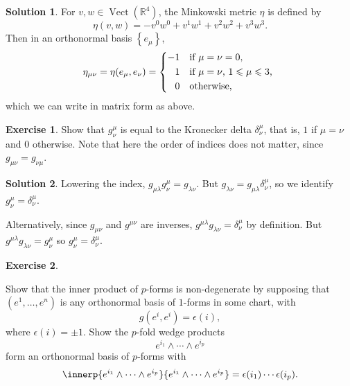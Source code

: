 \documentclass[11pt, a4paper]{report}
\theoremstyle{definition}
\newtheorem{exercise}{Exercise}[part]
\newtheorem{solution}{Solution}[part]
\newenvironment{ex}{\begin{exercise}}{\end{exercise}\pagebreak[1]}
\newenvironment{sol}{\begin{solution}}{\end{solution}\pagebreak[3]}
\renewcommand{\leq}{\leqslant}
\DeclareMathOperator{\Vect}{Vect}
\begin{document}
\begin{sol}

For $v, w \in \Vect(\mathbb{R}^4)$, the Minkowski metric $\eta$ is defined by
\[
    \eta(v, w) = -v^0 w^0 + v^1 w^1 + v^2 w^2 + v^3 w^3.
\]
Then in an orthonormal basis $\left\{e_\mu\right\}$,
\[
    \eta_{\mu\nu} = \eta(e_\mu, e_\nu) = \begin{dcases*}
            -1            & if $\mu = \nu = 0$, \\ %
            \phantom{-} 1 & if $\mu = \nu$, $1 \leq \mu \leq 3$, \\ %
            \phantom{-} 0 & otherwise,
        \end{dcases*}
\]
which we can write in matrix form as above.

\end{sol}

\begin{ex}

Show that $g^\mu_\nu$ is equal to the Kronecker delta $\delta^\mu_\nu$, that is, $1$ if $\mu = \nu$ and $0$ otherwise. Note that here the order of indices does not matter, since $g_{\mu\nu} = g_{\nu\mu}$.

\end{ex}

\begin{sol}

Lowering the index, $g_{\mu\lambda}g^\mu_\nu = g_{\lambda\nu}$.
But $g_{\lambda\nu} = g_{\mu\lambda}\delta^\mu_\nu$, so we identify $g^\mu_\nu = \delta^\mu_\nu$.

Alternatively, since $g_{\mu\nu}$ and $g^{\mu\nu}$ are inverses, $g^{\mu\lambda} g_{\lambda\nu} = \delta^\mu_\nu$ by definition.
But $g^{\mu\lambda} g_{\lambda\nu} = g^\mu_\nu$ so $g^\mu_\nu = \delta^\mu_\nu$.

\end{sol}

\begin{ex}\label{ex:innerproductpforms}

Show that the inner product of $p$-forms is non-degenerate by supposing that $(e^1, \ldots, e^n)$ is any orthonormal basis of $1$-forms in some chart, with
\[
    g(e^i, e^i) = \epsilon(i),
\]
where $\epsilon(i) = \pm 1$. Show the $p$-fold wedge products
\[
    e^{i_1} \wedge \cdots \wedge e^{i_p}
\]
form an orthonormal basis of $p$-forms with
\[
    \innerp{e^{i_1} \wedge \cdots \wedge e^{i_p}}
           {e^{i_1} \wedge \cdots \wedge e^{i_p}}
        = \epsilon(i_1) \cdots \epsilon(i_p).
\]

\end{ex}
\end{document}
